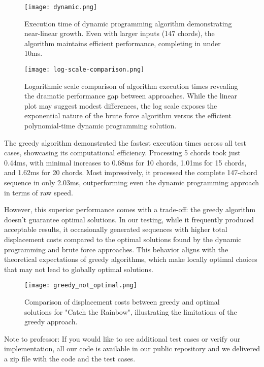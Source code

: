\documentclass[lettersize,journal]{IEEEtran}
\begin{document}
\begin{figure}[h!]
    \centering
    \texttt{[image: dynamic.png]}
    \caption{Execution time of dynamic programming algorithm demonstrating near-linear growth. Even with larger inputs (147 chords), the algorithm maintains efficient performance, completing in under 10ms.}
\end{figure}

\begin{figure}[h!]
    \centering
    \texttt{[image: log-scale-comparison.png]}
    \caption{Logarithmic scale comparison of algorithm execution times revealing the dramatic performance gap between approaches. While the linear plot may suggest modest differences, the log scale exposes the exponential nature of the brute force algorithm versus the efficient polynomial-time dynamic programming solution.}
\end{figure}

The greedy algorithm demonstrated the fastest execution times across all test cases, showcasing its computational efficiency. Processing 5 chords took just 0.44ms, with minimal increases to 0.68ms for 10 chords, 1.01ms for 15 chords, and 1.62ms for 20 chords. Most impressively, it processed the complete 147-chord sequence in only 2.03ms, outperforming even the dynamic programming approach in terms of raw speed.

However, this superior performance comes with a trade-off: the greedy algorithm doesn't guarantee optimal solutions. In our testing, while it frequently produced acceptable results, it occasionally generated sequences with higher total displacement costs compared to the optimal solutions found by the dynamic programming and brute force approaches. This behavior aligns with the theoretical expectations of greedy algorithms, which make locally optimal choices that may not lead to globally optimal solutions.

\begin{figure}
    \centering
    \texttt{[image: greedy\_not\_optimal.png]}
    \caption{Comparison of displacement costs between greedy and optimal solutions for "Catch the Rainbow", illustrating the limitations of the greedy approach.}
\end{figure}

Note to professor: If you would like to see additional test cases or verify our implementation, all our code is available in our public repository and we delivered a zip file with the code and the test cases.
\end{document}
